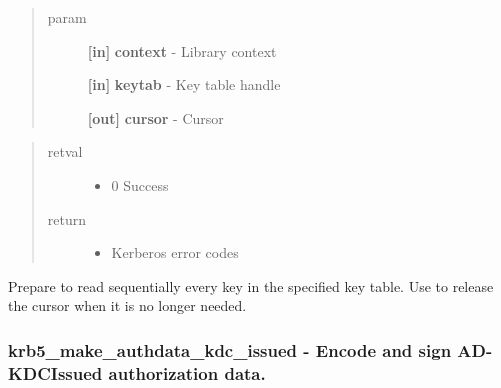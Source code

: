 \documentclass[letterpaper,10pt,english]{sphinxmanual}
\begin{document}
\begin{fulllineitems}
\label{appdev/refs/api/krb5_kt_start_seq_get:krb5_kt_start_seq_get}
\end{fulllineitems}

\begin{quote}\begin{description}
\item[{param}] \leavevmode
\textbf{{[}in{]}} \textbf{context} - Library context

\textbf{{[}in{]}} \textbf{keytab} - Key table handle

\textbf{{[}out{]}} \textbf{cursor} - Cursor

\end{description}\end{quote}
\begin{quote}\begin{description}
\item[{retval}] \leavevmode\begin{itemize}
\item {} 
0   Success

\end{itemize}

\item[{return}] \leavevmode\begin{itemize}
\item {} 
Kerberos error codes

\end{itemize}

\end{description}\end{quote}

Prepare to read sequentially every key in the specified key table. Use {\hyperref[appdev/refs/api/krb5_kt_end_seq_get:krb5_kt_end_seq_get]{}} to release the cursor when it is no longer needed.


\subsubsection{krb5\_make\_authdata\_kdc\_issued -  Encode and sign AD-KDCIssued authorization data.}
\label{appdev/refs/api/krb5_make_authdata_kdc_issued:krb5-make-authdata-kdc-issued-encode-and-sign-ad-kdcissued-authorization-data}\label{appdev/refs/api/krb5_make_authdata_kdc_issued::doc}
\end{document}
